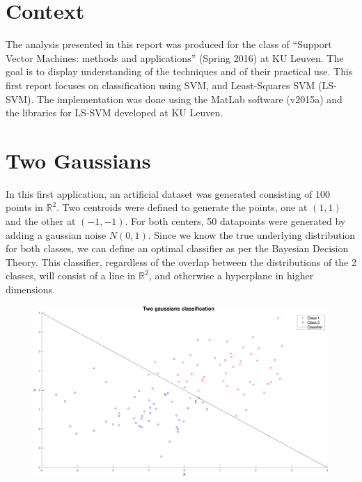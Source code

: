 \documentclass[11pt, a4paper]{article}
\begin{document}

\tableofcontents
\newpage

\section*{Context}

The analysis presented in this report was produced for the class of
``Support Vector Machines: methods and applications'' (Spring 2016) at
KU Leuven. The goal is to display understanding of the techniques and
of their practical use. This first report focuses on classification
using SVM, and Least-Squares SVM (LS-SVM). The implementation was done
using the MatLab software (v2015a) and the libraries for LS-SVM
developed at KU Leuven.

\section{Two Gaussians}

In this first application, an artificial dataset was generated
consisting of 100 points in $\mathbb{R}^2$. Two centroids were defined
to generate the points, one at $(1,1)$ and the other at $(-1,-1)$. For
both centers, 50 datapoints were generated by adding a gaussian noise
$N(0,1)$. Since we know the true underlying distribution for both
classes, we can define an optimal classifier as per the Bayesian
Decision Theory. This classifier, regardless of the overlap between
the distributions of the 2 classes, will consist of a line in
$\mathbb{R}^2$, and otherwise a hyperplane in higher dimensions.

\begin{figure}[H]
    \centering
    \includegraphics[scale=.40]{two_gaussians.pdf}
    \label{fig:two_gaussians}
\end{figure}
\end{document}
